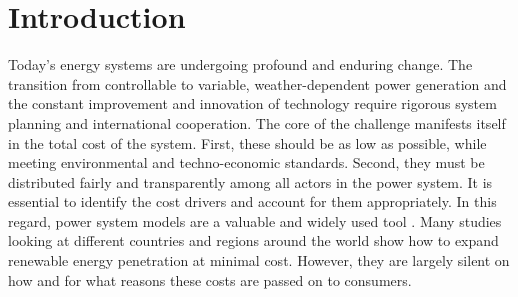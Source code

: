 \documentclass[11pt,twocolumn]{article}
\newcommand{\vpad}{\vspace{1mm}}
\newcommand{\generation}{g_{s,t}}
\newcommand{\nodalgeneration}[1][n]{g_{#1,t}}
\newcommand{\flow}{f_{\ell,t}}
\newcommand{\lmp}[1][n]{\lambda_{#1,t}}
\newcommand{\demand}[1][n]{d_{#1,t}}
\begin{document}


\section{Introduction}

Today's energy systems are undergoing profound and enduring change. The transition from controllable to variable, weather-dependent power generation and the constant improvement and innovation of technology require rigorous system planning and international cooperation. The core of the challenge manifests itself in the total cost of the system. First, these should be as low as possible, while meeting environmental and techno-economic standards. Second, they must be distributed fairly and transparently among all actors in the power system. It is essential to identify the cost drivers and account for them appropriately.  
In this regard, power system models are a valuable and widely used tool \cite{pfenninger_energy_2014,bazmi_sustainable_2011,pereira_generation_2017,brown_sectoral_2019}. Many studies looking at different countries and regions around the world show how to expand renewable energy penetration at minimal cost. However, they are largely silent on how and for what reasons these costs are passed on to consumers. 
\end{document}
